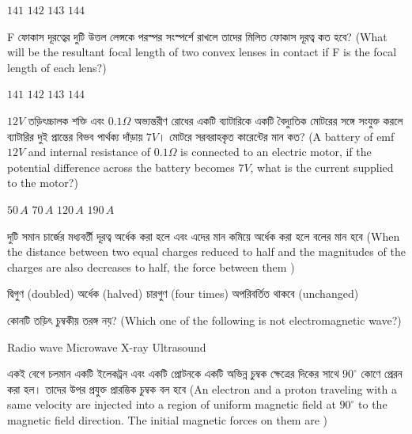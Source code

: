 \documentclass[addpoints]{exam}
\begin{document}
\begin{questions}
\begin{oneparchoices}
\choice $ 141 $
\choice $ 142 $
\choice $ 143 $
\choice $ 144 $
\end{oneparchoices}

\question   F ফোকাস দূরত্বের দুটি উত্তল লেন্সকে পরস্পর সংস্পর্শে রাখলে তাদের মিলিত ফোকাস দূরত্ব কত হবে? (What will be the resultant focal length of two convex lenses in contact if F is the focal length of each lens?)

\begin{oneparchoices}
\choice $ 141 $
\choice $ 142 $
\choice $ 143 $
\choice $ 144 $
\end{oneparchoices}



\question $ 12 V $ তড়িৎচ্চালক শক্তি এবং $ 0.1\Omega $ অভ্যন্তরীণ রোধের একটি ব্যাটারিকে  একটি বৈদ্যুতিক মোটরের সঙ্গে সংযুক্ত করলে ব্যাটারির দুই প্রান্তের বিভব পার্থক্য দাঁড়ায় $ 7 V $। মোটরে সরবরাহকৃত কারেন্টের মান কত? (A battery of emf $ 12 V $ and internal resistance of $ 0.1\Omega $ is connected to an electric motor, if the potential difference across the battery becomes $ 7 V $, what is the current supplied to the motor?)

\begin{oneparchoices}
\choice $ 50\,A $
\choice $ 70\,A $
\choice $ 120\,A $
\choice $ 190\,A $
\end{oneparchoices}

\question দুটি সমান চার্জের মধ্যবর্তী দূরত্ব অর্ধেক করা হলে এবং এদের মান কমিয়ে অর্ধেক করা হলে বলের মান হবে (When the distance between two equal charges reduced to half and the magnitudes of the charges are also decreases to half, the force between them )


\begin{oneparchoices}
\choice দ্বিগুণ (doubled)
\hspace*{-.4cm}\choice অর্ধেক (halved)
\hspace*{-.4cm}\choice চারগুণ (four times)
\hspace*{-.4cm}\choice অপরিবর্তিত থাকবে (unchanged)
\end{oneparchoices}

\question  কোনটি তড়িৎ চুম্বকীয় তরঙ্গ নয়? (Which one of the following is not electromagnetic wave?)

\begin{oneparchoices}
\choice Radio wave
\choice Microwave
\choice X-ray
\choice Ultrasound
\end{oneparchoices}

\question  একই বেগে চলমান একটি ইলেকট্রন এবং একটি প্রোটনকে একটি অভিন্ন চুম্বক ক্ষেত্রের দিকের সাথে $ 90^{\circ} $ কোণে প্রেরন করা হল। তাদের উপর প্রযুক্ত প্রারম্ভিক চুম্বক বল হবে (An electron and a proton traveling with a same velocity are injected into a region of uniform magnetic field at $ 90^{\circ} $ to the magnetic field direction. The initial magnetic forces on them are )


\end{questions}
\end{document}
